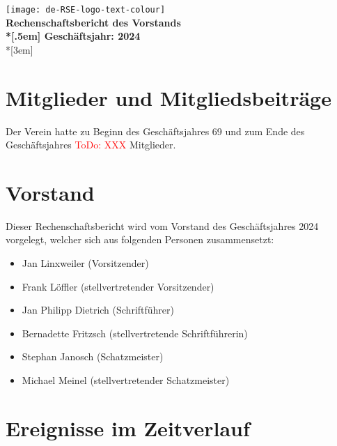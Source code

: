 \newcommand{\jahr}{2024}
\newcommand{\todo}[1]{\textcolor{red}{ToDo: #1}}



\thispagestyle{empty}

\begin{centering}
\texttt{[image: de-RSE-logo-text-colour]}\\
\vspace{3em}
\textbf{
 \Large Rechenschaftsbericht des Vorstands\\*[.5em]
 \normalsize Geschäftsjahr: \jahr}\\*[3em]
\end{centering}

\section{Mitglieder und Mitgliedsbeiträge}

Der Verein hatte zu Beginn des Geschäftsjahres 69 und zum Ende des Geschäftsjahres \todo{XXX} Mitglieder.

\section{Vorstand}

Dieser Rechenschaftsbericht wird vom Vorstand des Geschäftsjahres 2024 vorgelegt, welcher sich aus folgenden Personen zusammensetzt:

\begin{itemize}
  \setlength{\itemsep}{0pt plus 1pt}
  \item Jan Linxweiler (Vorsitzender)
  \item Frank Löffler (stellvertretender Vorsitzender)
  \item Jan Philipp Dietrich (Schriftführer)
  \item Bernadette Fritzsch (stellvertretende Schriftführerin)
  \item Stephan Janosch (Schatzmeister)
  \item Michael Meinel (stellvertretender Schatzmeister)
\end{itemize}

\section{Ereignisse im Zeitverlauf}

